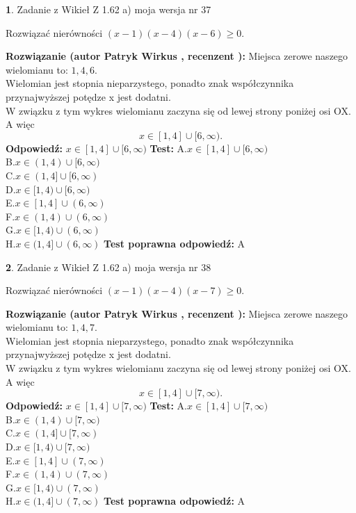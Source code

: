 \documentclass[12pt, a4paper]{article}
\theoremstyle{definition} %
\newtheorem{zad}{}
\newcommand{\zadStart}[1]{\begin{zad}#1\newline}
\newcommand{\zadStop}{\end{zad}}
\newcommand{\rozwStart}[2]{\noindent \textbf{Rozwiązanie (autor #1 , recenzent #2): }\newline}
\newcommand{\rozwStop}{\newline}
\newcommand{\odpStart}{\noindent \textbf{Odpowiedź:}\newline}
\newcommand{\odpStop}{\newline}
\newcommand{\testStart}{\noindent \textbf{Test:}\newline}
\newcommand{\testStop}{\newline}
\newcommand{\kluczStart}{\noindent \textbf{Test poprawna odpowiedź:}\newline}
\newcommand{\kluczStop}{\newline}
\begin{document}
\zadStart{Zadanie z Wikieł Z 1.62 a) moja wersja nr 37}

Rozwiązać nierówności $(x-1)(x-4)(x-6)\ge0$.
\zadStop
\rozwStart{Patryk Wirkus}{}
Miejsca zerowe naszego wielomianu to: $1, 4, 6$.\\
Wielomian jest stopnia nieparzystego, ponadto znak współczynnika przy\linebreak najwyższej potędze x jest dodatni.\\ W związku z tym wykres wielomianu zaczyna się od lewej strony poniżej osi OX. A więc $$x \in [1,4] \cup [6,\infty).$$
\rozwStop
\odpStart
$x \in [1,4] \cup [6,\infty)$
\odpStop
\testStart
A.$x \in [1,4] \cup [6,\infty)$\\
B.$x \in (1,4) \cup [6,\infty)$\\
C.$x \in (1,4] \cup [6,\infty)$\\
D.$x \in [1,4) \cup [6,\infty)$\\
E.$x \in [1,4] \cup (6,\infty)$\\
F.$x \in (1,4) \cup (6,\infty)$\\
G.$x \in [1,4) \cup (6,\infty)$\\
H.$x \in (1,4] \cup (6,\infty)$
\testStop
\kluczStart
A
\kluczStop



\zadStart{Zadanie z Wikieł Z 1.62 a) moja wersja nr 38}

Rozwiązać nierówności $(x-1)(x-4)(x-7)\ge0$.
\zadStop
\rozwStart{Patryk Wirkus}{}
Miejsca zerowe naszego wielomianu to: $1, 4, 7$.\\
Wielomian jest stopnia nieparzystego, ponadto znak współczynnika przy\linebreak najwyższej potędze x jest dodatni.\\ W związku z tym wykres wielomianu zaczyna się od lewej strony poniżej osi OX. A więc $$x \in [1,4] \cup [7,\infty).$$
\rozwStop
\odpStart
$x \in [1,4] \cup [7,\infty)$
\odpStop
\testStart
A.$x \in [1,4] \cup [7,\infty)$\\
B.$x \in (1,4) \cup [7,\infty)$\\
C.$x \in (1,4] \cup [7,\infty)$\\
D.$x \in [1,4) \cup [7,\infty)$\\
E.$x \in [1,4] \cup (7,\infty)$\\
F.$x \in (1,4) \cup (7,\infty)$\\
G.$x \in [1,4) \cup (7,\infty)$\\
H.$x \in (1,4] \cup (7,\infty)$
\testStop
\kluczStart
A
\kluczStop
\end{document}
